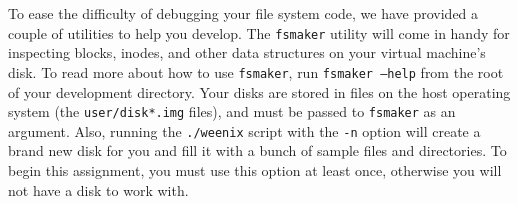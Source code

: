 To ease the difficulty of debugging your file system code, we have provided a couple of utilities to help you develop. The \texttt{fsmaker} utility will come in handy for inspecting blocks, inodes, and other data structures on your virtual machine's disk. To read more about how to use \texttt{fsmaker}, run \texttt{fsmaker --help} from the root of your development directory. Your disks are stored in files on the host operating system (the \texttt{user/disk*.img} files), and must be passed to \texttt{fsmaker} as an argument. Also, running the \texttt{./weenix} script with the \texttt{-n} option will create a brand new disk for you and fill it with a bunch of sample files and directories. To begin this assignment, you must use this option at least once, otherwise you will not have a disk to work with.
